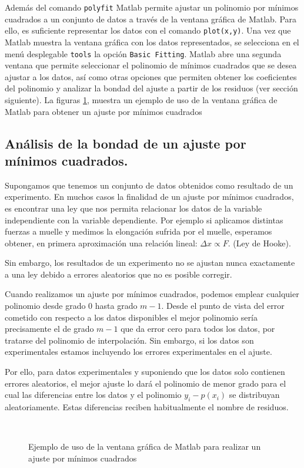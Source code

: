 \begin{paracol}{2}
Además del comando \texttt{polyfit} Matlab permite ajustar un polinomio por mínimos cuadrados a un conjunto de datos a través de la ventana gráfica de Matlab. Para ello, es suficiente representar los datos con el comando \texttt{plot(x,y)}. Una vez que Matlab muestra la ventana gráfica con los datos representados, se selecciona en el menú desplegable \texttt{tools} la opción \texttt{Basic Fitting}. Matlab abre una segunda ventana que permite seleccionar el polinomio de mínimos cuadrados que se desea ajustar a los datos, así como otras opciones que permiten obtener los coeficientes del polinomio y analizar la bondad del ajuste a partir de los residuos (ver sección siguiente). La figuras \ref{fig:minimos}, muestra un ejemplo de uso de la ventana gráfica de Matlab para obtener un ajuste por mínimos cuadrados 

\subsection{Análisis de la bondad de un ajuste por mínimos cuadrados.} 
Supongamos que tenemos un conjunto de datos obtenidos como resultado de un experimento. En muchos casos la finalidad de un ajuste por mínimos cuadrados, es encontrar una ley que nos permita relacionar los datos de la variable independiente con la variable dependiente. Por ejemplo si aplicamos distintas fuerzas a muelle y medimos la elongación sufrida por el muelle, esperamos obtener, en primera aproximación una relación lineal: $\Delta x\propto F$. (Ley de Hooke). 

Sin embargo, los resultados de un experimento no se ajustan nunca exactamente a una ley debido a errores aleatorios que no es posible corregir.

Cuando realizamos un ajuste por mínimos cuadrados, podemos emplear cualquier polinomio desde grado $0$ hasta grado $m-1$. Desde el punto de vista del error cometido con respecto a los datos disponibles el mejor polinomio sería precisamente el de grado $m-1$ que da error cero para todos los datos, por tratarse del polinomio de interpolación. Sin embargo, si los datos son experimentales estamos incluyendo los errores experimentales en el ajuste.

Por ello, para datos experimentales y suponiendo que los datos solo contienen errores aleatorios, el mejor ajuste lo dará el polinomio de menor grado para el cual las diferencias entre los datos y el polinomio $y_i-p(x_i)$ se distribuyan aleatoriamente. Estas diferencias reciben habitualmente el nombre de residuos.  
\end{paracol}
\begin{figure}[h]
\centering
{} \qquad 
{}\\
\caption{Ejemplo de uso de la ventana gráfica de Matlab para realizar un ajuste por mínimos cuadrados}
\label{fig:minimos}
\end{figure}


